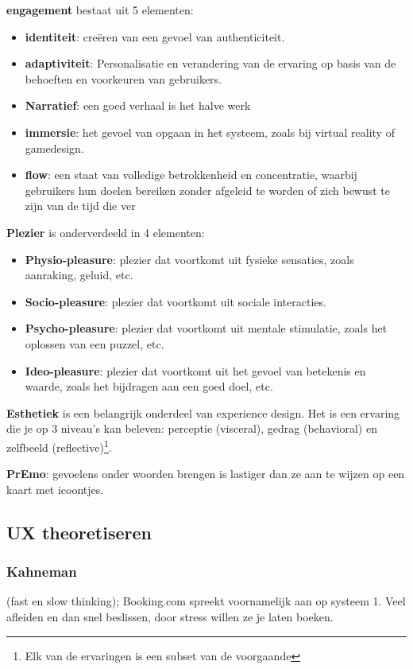 \documentclass[nonacm, sigconf, balance=true]{acmart}
\begin{document}
    \noindent\textbf{engagement} bestaat uit 5 elementen:
    \begin{itemize}
        \item \textbf{identiteit}: creëren van een gevoel van authenticiteit.
        \item \textbf{adaptiviteit}: Personalisatie en verandering van de ervaring op basis van de behoeften en voorkeuren van gebruikers.
        \item \textbf{Narratief}: een goed verhaal is het halve werk
        \item \textbf{immersie}: het gevoel van opgaan in het systeem, zoals bij virtual reality of gamedesign.
        \item \textbf{flow}: een staat van volledige betrokkenheid en concentratie, waarbij gebruikers hun doelen bereiken zonder afgeleid te worden of zich bewust te zijn van de tijd die ver
    \end{itemize}

    \noindent\textbf{Plezier} is onderverdeeld in 4 elementen:
    \begin{itemize}
        \item \textbf{Physio-pleasure}: plezier dat voortkomt uit fysieke sensaties, zoals aanraking, geluid, etc.
        \item \textbf{Socio-pleasure}: plezier dat voortkomt uit sociale interacties.
        \item \textbf{Psycho-pleasure}: plezier dat voortkomt uit mentale stimulatie, zoals het oplossen van een puzzel, etc.
        \item \textbf{Ideo-pleasure}: plezier dat voortkomt uit het gevoel van betekenis en waarde, zoals het bijdragen aan een goed doel, etc.
    \end{itemize}

    \noindent\textbf{Esthetiek} is een belangrijk onderdeel van experience design.
    Het is een ervaring die je op 3 niveau's kan beleven: perceptie (visceral), gedrag (behavioral) en zelfbeeld (reflective)\footnote{Elk van de ervaringen is een subset van de voorgaande}.

    \textbf{PrEmo}: gevoelens onder woorden brengen is lastiger dan ze aan te wijzen op een kaart met icoontjes.

    \subsection{UX theoretiseren}

    \subsubsection{Kahneman} (fast en slow thinking); Booking.com spreekt voornamelijk aan op systeem 1.
    Veel afleiden en dan snel beslissen, door stress willen ze je laten boeken.
\end{document}
